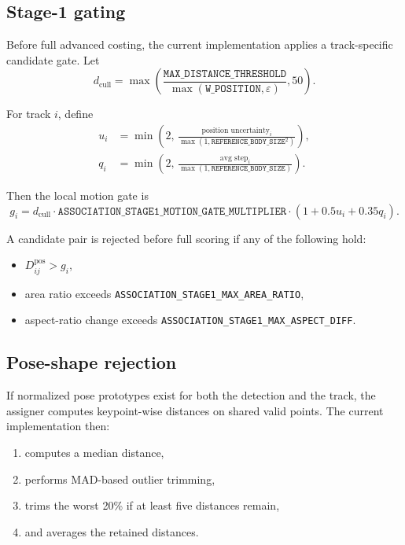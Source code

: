 \documentclass[11pt]{article}
\newcommand{\runtimekey}[1]{\texttt{#1}}
\begin{document}
\subsection{Stage-1 gating}

Before full advanced costing, the current implementation applies a track-specific candidate gate. Let
\begin{equation}
  d_{\text{cull}} = \max\!\left(
    \frac{\runtimekey{MAX\_DISTANCE\_THRESHOLD}}{\max(\runtimekey{W\_POSITION}, \varepsilon)},
    50
  \right).
\end{equation}

For track $i$, define
\begin{equation}
  \begin{aligned}
    u_i &= \min\!\left(2,\,
    \frac{\text{position uncertainty}_i}{\max(1,\runtimekey{REFERENCE\_BODY\_SIZE}^2)}
    \right), \\
    q_i &= \min\!\left(2,\,
    \frac{\text{avg step}_i}{\max(1,\runtimekey{REFERENCE\_BODY\_SIZE})}
    \right).
  \end{aligned}
\end{equation}

Then the local motion gate is
\begin{equation}
  g_i =
  d_{\text{cull}}
  \cdot \runtimekey{ASSOCIATION\_STAGE1\_MOTION\_GATE\_MULTIPLIER}
  \cdot \left(1 + 0.5u_i + 0.35q_i\right).
\end{equation}

A candidate pair is rejected before full scoring if any of the following hold:

\begin{itemize}
  \item $D^{\text{pos}}_{ij} > g_i$,
  \item area ratio exceeds \runtimekey{ASSOCIATION\_STAGE1\_MAX\_AREA\_RATIO},
  \item aspect-ratio change exceeds \runtimekey{ASSOCIATION\_STAGE1\_MAX\_ASPECT\_DIFF}.
\end{itemize}

\subsection{Pose-shape rejection}

If normalized pose prototypes exist for both the detection and the track, the assigner computes keypoint-wise distances on shared valid points. The current implementation then:

\begin{enumerate}
  \item computes a median distance,
  \item performs MAD-based outlier trimming,
  \item trims the worst 20\% if at least five distances remain,
  \item and averages the retained distances.
\end{enumerate}
\end{document}
